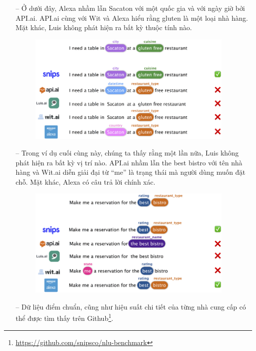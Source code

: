 \begin{itemize}
\begin{figure}[htp]
    \label{fig:system-class-intent}
		\end{figure}
		
		\item[--]Ở dưới đây, Alexa nhầm lẫn Sacaton với một quốc gia và với ngày giờ bởi API.ai. API.ai cùng với Wit và Alexa hiểu rằng gluten là một loại nhà hàng. Mặt khác, Luis không phát hiện ra bất kỳ thuộc tính nào.

	\begin{figure}[htp]
    \centering
    \includegraphics[width=10cm]{images/ComparisonOfNLU/slotfilling2.png}
    
    \label{fig:system-class-intent}
		\end{figure}
		
	\item[--]Trong ví dụ cuối cùng này, chúng ta thấy rằng một lần nữa, Luis không phát hiện ra bất kỳ vị trí nào. API.ai nhầm lẫn the best bistro với tên nhà hàng và Wit.ai diễn giải đại từ “me” là trạng thái mà người dùng muốn đặt chỗ. Mặt khác, Alexa có câu trả lời chính xác.

	\begin{figure}[htp]
    \centering
    \includegraphics[width=10cm]{images/ComparisonOfNLU/slotfilling3.png}
    
    \label{fig:system-class-intent}
		\end{figure}
		
	
	\item[--]Dữ liệu điểm chuẩn, cũng như hiệu suất chi tiết của từng nhà cung cấp có thể được tìm thấy trên Github\footnote{\url{https://github.com/snipsco/nlu-benchmark}}.
	

\end{itemize}
